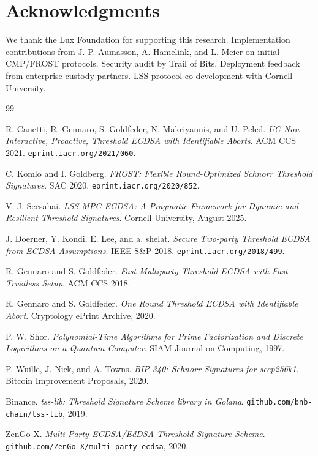 \section*{Acknowledgments}


We thank the Lux Foundation for supporting this research. Implementation contributions from J.-P. Aumasson, A. Hamelink, and L. Meier on initial CMP/FROST protocols. Security audit by Trail of Bits. Deployment feedback from enterprise custody partners. LSS protocol co-development with Cornell University.


\begin{thebibliography}{99}

R. Canetti, R. Gennaro, S. Goldfeder, N. Makriyannis, and U. Peled.
\textit{UC Non-Interactive, Proactive, Threshold ECDSA with Identifiable Aborts}.
ACM CCS 2021. \texttt{eprint.iacr.org/2021/060}.

C. Komlo and I. Goldberg.
\textit{FROST: Flexible Round-Optimized Schnorr Threshold Signatures}.
SAC 2020. \texttt{eprint.iacr.org/2020/852}.

V. J. Seesahai.
\textit{LSS MPC ECDSA: A Pragmatic Framework for Dynamic and Resilient Threshold Signatures}.
Cornell University, August 2025.

J. Doerner, Y. Kondi, E. Lee, and a. shelat.
\textit{Secure Two-party Threshold ECDSA from ECDSA Assumptions}.
IEEE S\&P 2018. \texttt{eprint.iacr.org/2018/499}.

R. Gennaro and S. Goldfeder.
\textit{Fast Multiparty Threshold ECDSA with Fast Trustless Setup}.
ACM CCS 2018.

R. Gennaro and S. Goldfeder.
\textit{One Round Threshold ECDSA with Identifiable Abort}.
Cryptology ePrint Archive, 2020.

P. W. Shor.
\textit{Polynomial-Time Algorithms for Prime Factorization and Discrete Logarithms on a Quantum Computer}.
SIAM Journal on Computing, 1997.

P. Wuille, J. Nick, and A. Towns.
\textit{BIP-340: Schnorr Signatures for secp256k1}.
Bitcoin Improvement Proposals, 2020.

Binance.
\textit{tss-lib: Threshold Signature Scheme library in Golang}.
\texttt{github.com/bnb-chain/tss-lib}, 2019.

ZenGo X.
\textit{Multi-Party ECDSA/EdDSA Threshold Signature Scheme}.
\texttt{github.com/ZenGo-X/multi-party-ecdsa}, 2020.


\end{thebibliography}
